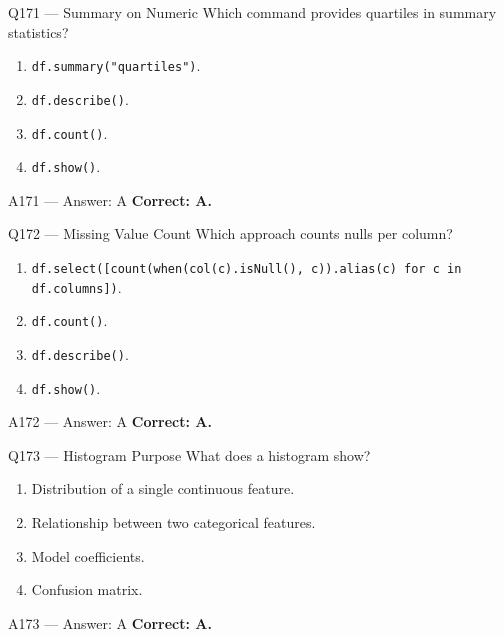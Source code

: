 \documentclass[aspectratio=169,9pt]{beamer}
\begin{document}
	\begin{frame}{Q171 --- Summary on Numeric}
		Which command provides quartiles in summary statistics?
		\begin{enumerate}[label=\Alph*.]
			\item \texttt{df.summary("quartiles")}.
			\item \texttt{df.describe()}.
			\item \texttt{df.count()}.
			\item \texttt{df.show()}.
		\end{enumerate}
	\end{frame}
	
	\begin{frame}{A171 --- Answer: A}
		\textbf{Correct: A.}
	\end{frame}
	
	\begin{frame}{Q172 --- Missing Value Count}
		Which approach counts nulls per column?
		\begin{enumerate}[label=\Alph*.]
			\item \texttt{df.select([count(when(col(c).isNull(), c)).alias(c) for c in df.columns])}.
			\item \texttt{df.count()}.
			\item \texttt{df.describe()}.
			\item \texttt{df.show()}.
		\end{enumerate}
	\end{frame}
	
	\begin{frame}{A172 --- Answer: A}
		\textbf{Correct: A.}
	\end{frame}
	
	\begin{frame}{Q173 --- Histogram Purpose}
		What does a histogram show?
		\begin{enumerate}[label=\Alph*.]
			\item Distribution of a single continuous feature.
			\item Relationship between two categorical features.
			\item Model coefficients.
			\item Confusion matrix.
		\end{enumerate}
	\end{frame}
	
	\begin{frame}{A173 --- Answer: A}
		\textbf{Correct: A.}
	\end{frame}
	
\end{document}
